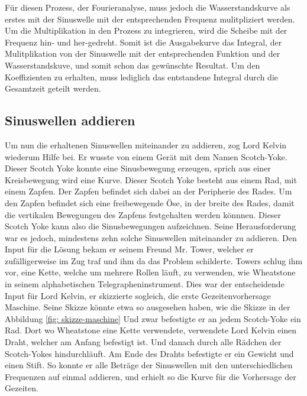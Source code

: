Für diesen Prozess, der Fourieranalyse, muss jedoch die  Wasserstandskurve als erstes mit der Sinuswelle mit der entsprechenden Frequenz mulitpliziert werden.
Um die Multiplikation in den Prozess zu integrieren, wird die Scheibe mit der Frequenz hin- und her-gedreht.
Somit ist die Ausgabekurve das Integral, der Mulitplikation von der Sinuswelle mit der entsprechenden Funktion und der Wasserstandskuve, und somit schon das gewünschte Resultat.
Um den Koeffizienten zu erhalten, muss lediglich das entstandene Integral durch die Gesamtzeit geteilt werden.

\subsection{Sinuswellen addieren}

Um nun die erhaltenen Sinuswellen miteinander zu addieren, zog Lord Kelvin wiederum Hilfe bei.
Er wusste von einem Gerät mit dem Namen Scotch-Yoke.
Dieser Scotch Yoke konnte eine Sinusbewegung erzeugen, sprich aus einer Kreisbewegung wird eine Kurve.
Dieser Scotch Yoke besteht aus einem Rad, mit einem Zapfen.
Der Zapfen befindet sich dabei an der Peripherie des Rades.
Um den Zapfen befindet sich eine freibewegende Öse, in der breite des Rades, damit die vertikalen Bewegungen des Zapfens festgehalten werden könnnen.
Dieser Scotch Yoke kann also die Sinusbewegungen aufzeichnen.
Seine Herausforderung war es jedoch, mindestens zehn solche Sinuswellen miteinander zu addieren.
Den Input für die Lösung bekam er seinem Freund Mr. Tower, welcher er zufälligerweise im Zug traf und ihm da das Problem schilderte.
Towers schlug ihm vor, eine Kette, welche um mehrere Rollen läuft, zu verwenden, wie Wheatstone in seinem alphabetischen Telegrapheninstrument.
Dies war der entscheidende Input für Lord Kelvin, er skizzierte sogleich, die erste Gezeitenvorhersage Maschine. Seine Skizze könnte etwa so ausgesehen haben, wie die Skizze in der Abbildung \ref{fig: skizze-maschine}
Und zwar befestigte er an jedem Scotch-Yoke ein Rad.
Dort wo Wheatstone eine Kette verwendete, verwendete Lord Kelvin einen Draht, welcher am Anfang befestigt ist.
Und danach durch alle Rädchen der Scotch-Yokes hindurchläuft.
Am Ende des Drahts befestigte er ein Gewicht und einen Stift.
So konnte er alle Beträge der Sinuswellen mit den unterschiedlichen Frequenzen auf einmal addieren, und erhielt so die Kurve für die Vorhersage der Gezeiten.

